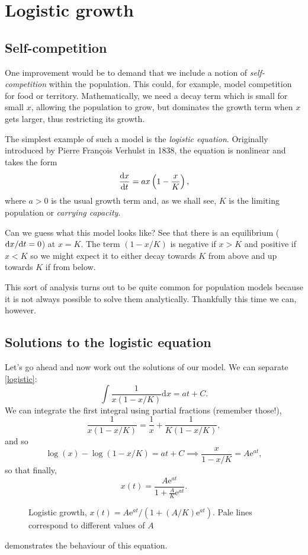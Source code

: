 \documentclass[12pt,a4paper,openany,twoside]{book}
\renewcommand{\d}{{\mathrm d}}
\newcommand{\fd}[2]{\mathchoice{\frac{\d #1}{\d #2}}{\d #1/\d #2}{\d #1/\d #2}{\d #1/\d #2}}
\newcommand{\e}{\mathrm{e}}
\begin{document}
\section{Logistic growth}
\label{sec:logistic-growth}
\subsection{Self-competition}
One improvement would be to demand that we include a notion of \emph{self-competition} within the population. This could, for example, model competition for food or territory. Mathematically, we need a decay term which is small for small $x$, allowing the population to grow, but dominates the growth term when $x$ gets larger, thus restricting its growth. 

The simplest example of such a model is the \emph{logistic equation}. Originally introduced by Pierre Fran\c{c}ois Verhulst in 1838, the equation is nonlinear and takes the form
\begin{equation}
	\label{logistic}
	\fd{x}{t} = a x\left(1-\frac{x}{K}\right),
\end{equation}
where $a>0$ is the usual growth term and, as we shall see, $K$ is the limiting population or \emph{carrying capacity}. 

Can we guess what this model looks like?  See that there is an equilibrium ($\fd{x}{t} = 0$) at $x=K$. The term $(1-x/K)$ is negative if $x>K$ and positive if $x<K$ so we might expect it to either decay towards $K$ from above and up towards $K$ if from below. 

This sort of analysis turns out to be quite common for population models because it is not always possible to solve them analytically. Thankfully this time we can, however.

\subsection{Solutions to the logistic equation}
Let's go ahead and now work out the solutions of our model. We can separate \cref{logistic}:
\begin{equation}
	\int\frac{1}{x(1 - x/K)}\d x = at + C.
\end{equation}
We can integrate the first integral using partial fractions (remember those!),
\begin{equation}
	\frac{1}{x(1 - x/K)} = \frac{1}{x} + \frac{1}{K\left(1-x/K\right)},
\end{equation}
and so
\begin{equation}
	\log(x) - \log(1-x/K)  =a t+C \implies   \frac{x}{1-x/K}  =   A\e^{at},
\end{equation}
so that finally,
\begin{equation}
	\label{logsol}
	x(t) = \frac{A \e^{a t}}{1+ \frac{A}{K}\e^{at}}.
\end{equation}
%
\begin{figure}%
	\centering
	
	\caption[Logistic growth]{Logistic growth, $x(t) = A\e^{a t}/(1+(A/K)\e^{at})$. Pale lines correspond to different values of $A$}
	\label{fig:logistic-growth}
\end{figure}%
 demonstrates the behaviour of this equation.
\end{document}

